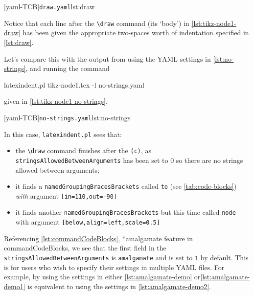 \begin{cmhtcbraster}[raster column skip=.1\linewidth]
  [yaml-TCB]{\texttt{draw.yaml}}{lst:draw}
 \end{cmhtcbraster}

 Notice that each line after the \lstinline!\draw! command (its `body') in
 \cref{lst:tikz-node1-draw} has been given the appropriate two-spaces worth of indentation
 specified in \cref{lst:draw}.

 Let's compare this with the output from using the YAML settings in \cref{lst:no-strings},
 and running the command 
 \begin{commandshell}
latexindent.pl tikz-node1.tex -l no-strings.yaml  
\end{commandshell}
 given in \cref{lst:tikz-node1-no-strings}.

 \begin{cmhtcbraster}[raster column skip=.1\linewidth]
  [yaml-TCB]{\texttt{no-strings.yaml}}{lst:no-strings}
 \end{cmhtcbraster}

 In this case, \texttt{latexindent.pl} sees that:
 \begin{itemize}
  \item the \lstinline!\draw! command finishes after the \lstinline!(c)!, as
        \texttt{stringsAllowedBetweenArguments} has been set to $0$ so there are no strings
        allowed between arguments;
  \item it finds a \texttt{namedGroupingBracesBrackets} called \texttt{to} (see
        \vref{tab:code-blocks}) \emph{with} argument \lstinline![in=110,out=-90]!
  \item it finds another \texttt{namedGroupingBracesBrackets} but this time called \texttt{node}
        with argument \lstinline![below,align=left,scale=0.5]!
 \end{itemize}

 Referencing \vref{lst:commandCodeBlocks}, *{amalgamate feature in
 commandCodeBlocks}, we see that the first field in the
 \texttt{stringsAllowedBetweenArguments} is \texttt{amalgamate} and is set to \texttt{1}
 by default. This is for users who wish to specify their settings in multiple YAML files.
 For example, by using the settings in either \cref{lst:amalgamate-demo}
 or\cref{lst:amalgamate-demo1} is equivalent to using the settings in
 \cref{lst:amalgamate-demo2}.%


